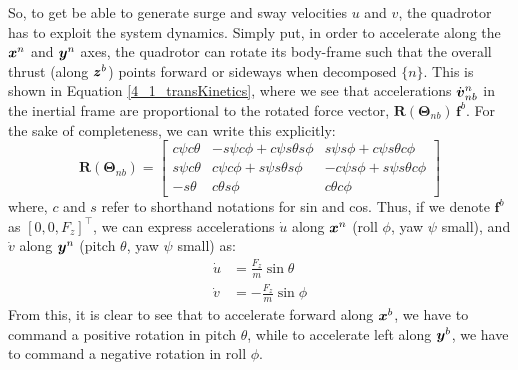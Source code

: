 So, to get be able to generate surge and sway velocities $u$ and $v$, the quadrotor has to exploit the system dynamics. Simply put, in order to accelerate along the ${\boldsymbol{x}}^n$ and ${\boldsymbol{y}}^n$ axes, the quadrotor can rotate its body-frame such that the overall thrust (along ${\boldsymbol{z}}^b$) points forward or sideways when decomposed $\{n\}$. This is shown in Equation \eqref{4_1_transKinetics}, where we see that accelerations $\Dot{{\boldsymbol{v}}}^n_{nb}$ in the inertial frame are proportional to the rotated force vector, $\boldsymbol{R} (\boldsymbol{\Theta}_{nb})\, \boldsymbol{f}^b$. For the sake of completeness, we can write this explicitly:
\begin{equation}
    \boldsymbol{R} (\boldsymbol{\Theta}_{nb}) = \begin{bmatrix}
    c\psi c\theta & -s\psi c\phi + c\psi s\theta s\phi & s\psi s\phi + c\psi s\theta c\phi \\
    s\psi c\theta & c\psi c\phi + s\psi s\theta s\phi & -c\psi s\phi + s\psi s\theta c\phi \\
    -s\theta &  c\theta s\phi & c\theta c\phi 
    \end{bmatrix}
\end{equation}
where, $c$ and $s$ refer to shorthand notations for sin and cos. Thus, if we denote $\boldsymbol{f}^b$ as $[0,0,F_z]^\top$, we can express accelerations $\dot u$ along ${\boldsymbol{x}}^n$ (roll $\phi$, yaw $\psi$ small), and $\dot v$ along ${\boldsymbol{y}}^n$ (pitch $\theta$, yaw $\psi$ small) as:
\begin{align}
    \dot u &= \frac{F_z}{m} \sin{\theta} \label{4_2_udot} \\
    \dot v &= - \frac{F_z}{m} \sin{\phi} \label{4_2_vdot}
\end{align}
From this, it is clear to see that to accelerate forward along ${\boldsymbol{x}}^b$, we have to command a positive rotation in pitch $\theta$, while to accelerate left along ${\boldsymbol{y}}^b$, we have to command a negative rotation in roll $\phi$. 

